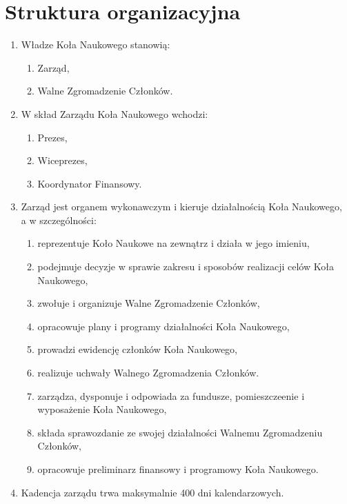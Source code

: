 \documentclass[12pt,a4paper]{article}
\begin{document}
    \section{Struktura organizacyjna}
    \begin{enumerate}
        \item Władze Koła Naukowego stanowią:
            \begin{enumerate}
                \item Zarząd,
                \item Walne Zgromadzenie Członków.
            \end{enumerate}
        \item W skład Zarządu Koła Naukowego wchodzi:
            \begin{enumerate}
                \item Prezes,
                \item Wiceprezes,
                \item Koordynator Finansowy.
            \end{enumerate}
        \item Zarząd jest organem wykonawczym i kieruje działalnością Koła Naukowego, \\ a w szczególności:
            \begin{enumerate}
                \item reprezentuje Koło Naukowe na zewnątrz i działa w jego imieniu,
                \item podejmuje decyzje w sprawie zakresu i sposobów realizacji celów Koła Naukowego,
                \item zwołuje i organizuje Walne Zgromadzenie Członków,
                \item opracowuje plany i programy działalności Koła Naukowego,
                \item prowadzi ewidencję członków Koła Naukowego,
                \item realizuje uchwały Walnego Zgromadzenia Członków.
                \item zarządza, dysponuje i odpowiada za fundusze, pomieszczeenie i wyposażenie Koła Naukowego,
                \item składa sprawozdanie ze swojej działalności Walnemu Zgromadzeniu Członków,
                \item opracowuje preliminarz finansowy i programowy Koła Naukowego.
            \end{enumerate}
        \item Kadencja zarządu trwa maksymalnie 400 dni kalendarzowych.

\end{enumerate}
\end{document}
